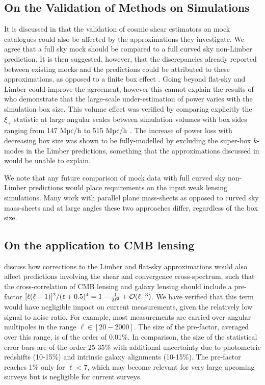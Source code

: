 \subsection{On the Validation of Methods on Simulations}
It is discussed in \citet{kitching/etal:2016} that the validation of cosmic shear estimators on mock catalogues could also be affected by the approximations they investigate.  We agree that a full sky mock should be compared to a full curved sky non-Limber prediction.  It is then suggested, however, that the discrepancies already reported between existing mocks and the predictions could be attributed to these approximations, as opposed to a finite box effect \citep{kiessling/etal:2011, harnois-deraps/etal:2012, harnois-deraps/vanwaerbeke:2015}.  Going beyond flat-sky and Limber could improve the agreement, however this cannot explain the results of \citet{harnois-deraps/vanwaerbeke:2015} who demonstrate that the large-scale under-estimation of power varies with the simulation box size. This volume effect was verified by comparing explicitly the $\xi_+$ statistic at large angular scales between simulation volumes with box sides  ranging from 147$\;\rm{Mpc/h}$ to 515$\;\rm{Mpc/h}$ \citep[see Fig. 5 in][]{harnois-deraps/vanwaerbeke:2015}. The increase of power loss with decreasing box size was shown to be fully-modelled by excluding the super-box $k$-modes in the Limber predictions, something that the approximations discussed in \citet{kitching/etal:2016} would be unable to explain.

We note that any future comparison of mock data with full curved sky non-Limber predictions would place requirements on the input weak lensing simulations.  Many work with parallel plane mass-sheets as opposed to curved sky mass-sheets and at large angles these two approaches differ, regardless of the box size. 

\subsection{On the application to CMB lensing}
\citet{kitching/etal:2016} discuss how corrections to the Limber and flat-sky approximations would also affect predictions involving the shear and convergence cross-spectrum, such that the cross-correlation of CMB lensing and galaxy lensing should include a pre-factor $ [\ell(\ell+1)]^2/(\ell+ 0.5)^4 = 1-{1\over 2\ell^2}+{\cal O}(\ell^{-3})$.   We have verified that this term would have negligible impact on current measurements, given the relatively low signal to noise ratio.  For example, most measurements \citep{hand/etal:2015, liu/hill:2015, kirk/etal:2016,harnois-deraps/etal:2016} are carried over angular multipoles in the range $\ell \in [20-2000]$.  The size of the pre-factor, averaged over this range, is of the order of 0.01\%. In comparison, the size of the statistical error bars are of the order 25-35\% with additional uncertainty due to photometric redshifts (10-15\%) and intrinsic galaxy alignments (10-15\%). The pre-factor reaches 1\% only for $\ell < 7$, which may become relevant for very large upcoming surveys but is negligible for current surveys. 

